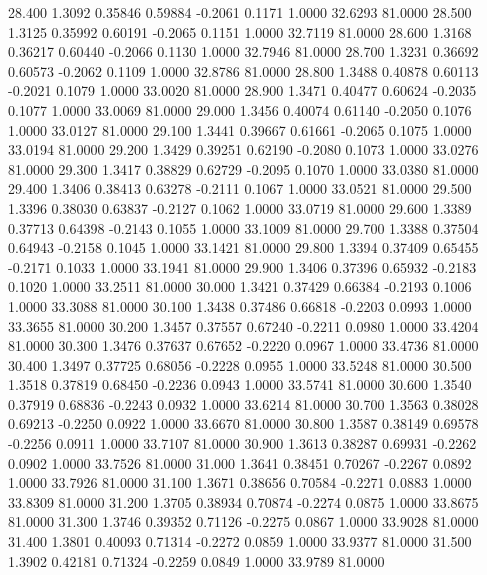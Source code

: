   28.400   1.3092   0.35846   0.59884  -0.2061   0.1171   1.0000  32.6293  81.0000
  28.500   1.3125   0.35992   0.60191  -0.2065   0.1151   1.0000  32.7119  81.0000
  28.600   1.3168   0.36217   0.60440  -0.2066   0.1130   1.0000  32.7946  81.0000
  28.700   1.3231   0.36692   0.60573  -0.2062   0.1109   1.0000  32.8786  81.0000
  28.800   1.3488   0.40878   0.60113  -0.2021   0.1079   1.0000  33.0020  81.0000
  28.900   1.3471   0.40477   0.60624  -0.2035   0.1077   1.0000  33.0069  81.0000
  29.000   1.3456   0.40074   0.61140  -0.2050   0.1076   1.0000  33.0127  81.0000
  29.100   1.3441   0.39667   0.61661  -0.2065   0.1075   1.0000  33.0194  81.0000
  29.200   1.3429   0.39251   0.62190  -0.2080   0.1073   1.0000  33.0276  81.0000
  29.300   1.3417   0.38829   0.62729  -0.2095   0.1070   1.0000  33.0380  81.0000
  29.400   1.3406   0.38413   0.63278  -0.2111   0.1067   1.0000  33.0521  81.0000
  29.500   1.3396   0.38030   0.63837  -0.2127   0.1062   1.0000  33.0719  81.0000
  29.600   1.3389   0.37713   0.64398  -0.2143   0.1055   1.0000  33.1009  81.0000
  29.700   1.3388   0.37504   0.64943  -0.2158   0.1045   1.0000  33.1421  81.0000
  29.800   1.3394   0.37409   0.65455  -0.2171   0.1033   1.0000  33.1941  81.0000
  29.900   1.3406   0.37396   0.65932  -0.2183   0.1020   1.0000  33.2511  81.0000
  30.000   1.3421   0.37429   0.66384  -0.2193   0.1006   1.0000  33.3088  81.0000
  30.100   1.3438   0.37486   0.66818  -0.2203   0.0993   1.0000  33.3655  81.0000
  30.200   1.3457   0.37557   0.67240  -0.2211   0.0980   1.0000  33.4204  81.0000
  30.300   1.3476   0.37637   0.67652  -0.2220   0.0967   1.0000  33.4736  81.0000
  30.400   1.3497   0.37725   0.68056  -0.2228   0.0955   1.0000  33.5248  81.0000
  30.500   1.3518   0.37819   0.68450  -0.2236   0.0943   1.0000  33.5741  81.0000
  30.600   1.3540   0.37919   0.68836  -0.2243   0.0932   1.0000  33.6214  81.0000
  30.700   1.3563   0.38028   0.69213  -0.2250   0.0922   1.0000  33.6670  81.0000
  30.800   1.3587   0.38149   0.69578  -0.2256   0.0911   1.0000  33.7107  81.0000
  30.900   1.3613   0.38287   0.69931  -0.2262   0.0902   1.0000  33.7526  81.0000
  31.000   1.3641   0.38451   0.70267  -0.2267   0.0892   1.0000  33.7926  81.0000
  31.100   1.3671   0.38656   0.70584  -0.2271   0.0883   1.0000  33.8309  81.0000
  31.200   1.3705   0.38934   0.70874  -0.2274   0.0875   1.0000  33.8675  81.0000
  31.300   1.3746   0.39352   0.71126  -0.2275   0.0867   1.0000  33.9028  81.0000
  31.400   1.3801   0.40093   0.71314  -0.2272   0.0859   1.0000  33.9377  81.0000
  31.500   1.3902   0.42181   0.71324  -0.2259   0.0849   1.0000  33.9789  81.0000
